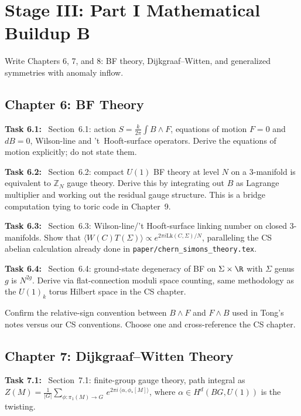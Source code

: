 \documentclass[11pt]{article}
\newcommand{\task}[1]{\medskip\noindent\textbf{Task #1:}\ }
\begin{document}
\section{Stage III: Part I Mathematical Buildup B}\label{sec:stageIII}

\begin{goalbox}[Objective]
Write Chapters 6, 7, and 8: BF theory, Dijkgraaf--Witten, and generalized symmetries
with anomaly inflow.
\end{goalbox}

\subsection{Chapter 6: BF Theory}

\task{6.1} Section~6.1: action $S = \frac{k}{2\pi}\int B\wedge F$, equations of motion
$F=0$ and $dB=0$, Wilson-line and 't~Hooft-surface operators. Derive the equations of
motion explicitly; do not state them.

\task{6.2} Section~6.2: compact $U(1)$ BF theory at level $N$ on a 3-manifold is
equivalent to $\mathbb{Z}_N$ gauge theory. Derive this by integrating out $B$ as
Lagrange multiplier and working out the residual gauge structure. This is a bridge
computation tying to toric code in Chapter~9.

\task{6.3} Section~6.3: Wilson-line/'t Hooft-surface linking number on closed
3-manifolds. Show that $\langle W(C) T(\Sigma)\rangle \propto e^{2\pi i \mathrm{Lk}(C,\Sigma)/N}$,
paralleling the CS abelian calculation already done in \texttt{paper/chern\_simons\_theory.tex}.

\task{6.4} Section~6.4: ground-state degeneracy of BF on $\Sigma\times\R$ with
$\Sigma$ genus $g$ is $N^{2g}$. Derive via flat-connection moduli space counting, same
methodology as the $U(1)_k$ torus Hilbert space in the CS chapter.

\begin{warningbox}
Confirm the relative-sign convention between $B\wedge F$ and $F\wedge B$ used in Tong's
notes versus our CS conventions. Choose one and cross-reference the CS chapter.
\end{warningbox}

\subsection{Chapter 7: Dijkgraaf--Witten Theory}

\task{7.1} Section~7.1: finite-group gauge theory, path integral as
$Z(M) = \frac{1}{|G|}\sum_{\phi:\pi_1(M)\to G}\,e^{2\pi i\,\langle\alpha,\phi_*[M]\rangle}$,
where $\alpha\in H^d(BG,U(1))$ is the twisting.
\end{document}
